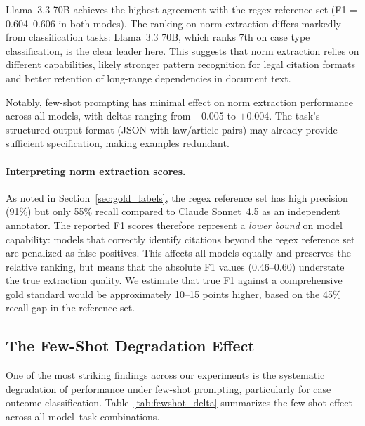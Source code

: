 \documentclass[11pt,a4paper]{article}
\begin{document}

Llama~3.3 70B achieves the highest agreement with the regex reference set (F1 = 0.604--0.606 in both modes). The ranking on norm extraction differs markedly from classification tasks: Llama~3.3 70B, which ranks 7th on case type classification, is the clear leader here. This suggests that norm extraction relies on different capabilities, likely stronger pattern recognition for legal citation formats and better retention of long-range dependencies in document text.

Notably, few-shot prompting has minimal effect on norm extraction performance across all models, with deltas ranging from $-$0.005 to $+$0.004. The task's structured output format (JSON with law/article pairs) may already provide sufficient specification, making examples redundant.

\paragraph{Interpreting norm extraction scores.} As noted in Section~\ref{sec:gold_labels}, the regex reference set has high precision (91\%) but only 55\% recall compared to Claude Sonnet~4.5 as an independent annotator. The reported F1 scores therefore represent a \emph{lower bound} on model capability: models that correctly identify citations beyond the regex reference set are penalized as false positives. This affects all models equally and preserves the relative ranking, but means that the absolute F1 values (0.46--0.60) understate the true extraction quality. We estimate that true F1 against a comprehensive gold standard would be approximately 10--15 points higher, based on the 45\% recall gap in the reference set.

\subsection{The Few-Shot Degradation Effect}
\label{sec:fewshot}

One of the most striking findings across our experiments is the systematic degradation of performance under few-shot prompting, particularly for case outcome classification. Table~\ref{tab:fewshot_delta} summarizes the few-shot effect across all model--task combinations.
\end{document}
